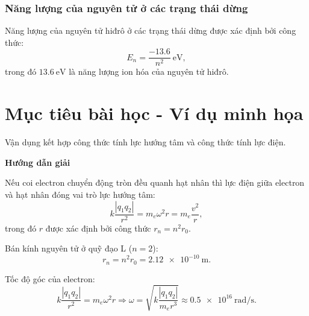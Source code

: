 \subsubsection{Năng lượng của nguyên tử ở các trạng thái dừng}
Năng lượng của nguyên tử hiđrô ở các trạng thái dừng được xác định bởi công thức:
\begin{equation}
	E_n= \dfrac {-13.6}{n ^2} \SI{}{\electronvolt},
\end{equation}
trong đó $\SI{13.6}{\electronvolt}$ là năng lượng ion hóa của nguyên tử hiđrô.

\section{Mục tiêu bài học - Ví dụ minh họa}
\begin{dang}{Vận dụng kết hợp công thức tính lực hướng tâm và công thức tính lực điện.}
	{\begin{center}
			\textbf{Hướng dẫn giải}
		\end{center}
		
		Nếu coi electron chuyển động tròn đều quanh hạt nhân thì lực điện giữa electron và hạt nhân đóng vai trò lực hướng tâm:
		\begin{equation*}
			k \dfrac {|q_1 q_2|}{r^2} = m_e \omega ^2 r = m_e \dfrac{v^2}{r},
		\end{equation*}
		trong đó $r$ được xác định bởi công thức $r_n = n^2 r_0$.
		
		Bán kính nguyên tử ở quỹ đạo L ($n = 2$):
		\begin{equation*}
			r_n =n^2 r_0 = \SI{2.12e-10}{\meter}.
		\end{equation*}
		
		Tốc độ góc của electron:
		\begin{equation*}
			k \dfrac {|q_1q_2|}{r^2} = m_e \omega ^2 r \Rightarrow \omega = \sqrt {k\dfrac{|q_1q_2|}{m_er^3}} \approx \SI{0.5e16}{\radian / \second}.
		\end{equation*}
		
}
\end{dang}
